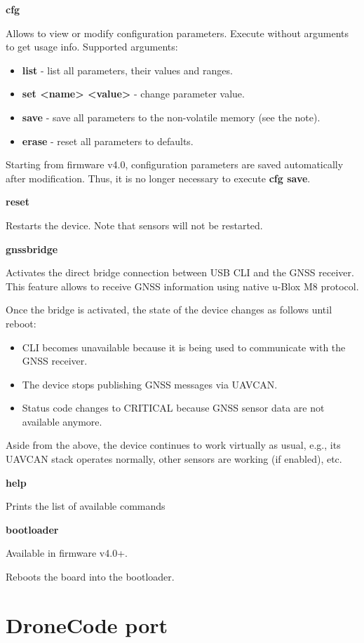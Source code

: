 \documentclass{zubaxdoc}
\begin{document}
\textbf{cfg}

Allows to view or modify configuration parameters.
Execute without arguments to get usage info. Supported arguments:
\begin{itemize}
\item \textbf{list} - list all parameters, their values and ranges.
\item \textbf{set <name> <value>} - change parameter value.
\item \textbf{save} - save all parameters to the non-volatile memory (see the note).
\item \textbf{erase} - reset all parameters to defaults.
\end{itemize}

Starting from firmware v4.0, configuration parameters are saved automatically after modification. Thus, it is no longer necessary to execute \textbf{cfg save}.

\textbf{reset}

Restarts the device. Note that sensors will not be restarted.

\textbf{gnssbridge}

Activates the direct bridge connection between USB CLI and the GNSS receiver. This feature allows to receive GNSS information using native u-Blox M8 protocol.

Once the bridge is activated, the state of the device changes as follows until reboot:
\begin{itemize}
\item CLI becomes unavailable because it is being used to communicate with the GNSS receiver.
\item The device stops publishing GNSS messages via UAVCAN.
\item Status code changes to CRITICAL because GNSS sensor data are not available anymore.
\end{itemize}

Aside from the above, the device continues to work virtually as usual, e.g., its UAVCAN stack operates normally, other sensors are working (if enabled), etc.

\textbf{help}

Prints the list of available commands

\textbf{bootloader}

Available in firmware v4.0+.

Reboots the board into the bootloader.

\chapter{DroneCode port}
\end{document}
